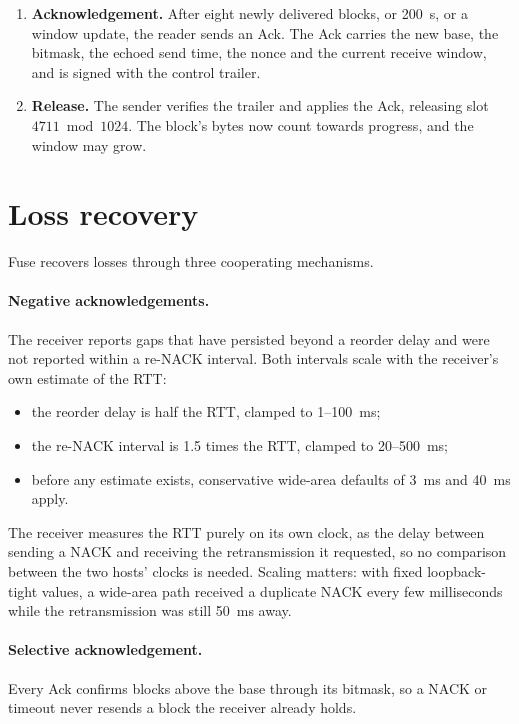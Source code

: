 \begin{enumerate}
    for 4,711 is set; if it was the first gap, the base slides forward. If the block came from a new source
    address, a path challenge is sent there (Section~\ref{sec:path}).
  \item \textbf{Acknowledgement.} After eight newly delivered blocks, or 200~\textmu s, or a window update, the
    reader sends an Ack. The Ack carries the new base, the bitmask, the echoed send time, the nonce and the
    current receive window, and is signed with the control trailer.
  \item \textbf{Release.} The sender verifies the trailer and applies the Ack, releasing slot $4711\bmod 1024$.
    The block's bytes now count towards progress, and the window may grow.
\end{enumerate}

\section{Loss recovery}\label{sec:recovery}

Fuse recovers losses through three cooperating mechanisms.

\paragraph{Negative acknowledgements.} The receiver reports gaps that have persisted beyond a reorder delay and
were not reported within a re-NACK interval. Both intervals scale with the receiver's own estimate of the RTT:
\begin{itemize}
  \item the reorder delay is half the RTT, clamped to 1--100~ms;
  \item the re-NACK interval is 1.5 times the RTT, clamped to 20--500~ms;
  \item before any estimate exists, conservative wide-area defaults of 3~ms and 40~ms apply.
\end{itemize}
The receiver measures the RTT purely on its own clock, as the delay between sending a NACK and receiving the
retransmission it requested, so no comparison between the two hosts' clocks is needed. Scaling matters: with
fixed loopback-tight values, a wide-area path received a duplicate NACK every few milliseconds while the
retransmission was still 50~ms away.

\paragraph{Selective acknowledgement\vviii.} Every Ack confirms blocks above the base through its bitmask, so a
NACK or timeout never resends a block the receiver already holds.

